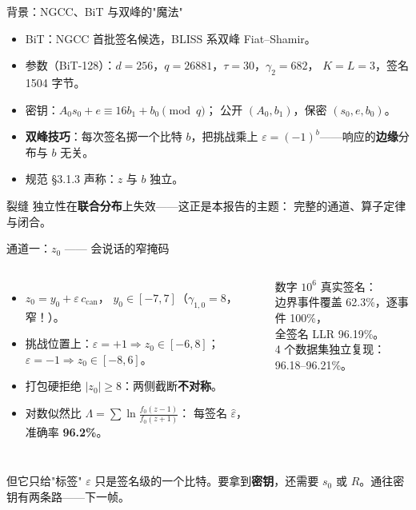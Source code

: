 \documentclass[11pt,aspectratio=169]{ctexbeamer}
\begin{document}
\begin{frame}{背景：NGCC、BiT 与双峰的"魔法"}
  \begin{itemize}
    \item BiT：NGCC 首批签名候选，BLISS 系双峰 Fiat--Shamir。
    \item 参数（BiT-128）：$d=256$，$q=26881$，$\tau=30$，$\gamma_2=682$，
          $K=L=3$，签名 1504 字节。
    \item 密钥：$A_0 s_0 + e \equiv 16 b_1 + b_0 \pmod q$；
          公开 $(A_0,b_1)$，保密 $(s_0,e,b_0)$。
    \item \textbf{双峰技巧}：每次签名掷一个比特 $b$，把挑战乘上
          $\varepsilon = (-1)^b$——响应的\textbf{边缘}分布与 $b$ 无关。
    \item 规范 §3.1.3 声称：$z$ 与 $b$ 独立。
  \end{itemize}
  \begin{alertblock}{裂缝}
    \small 独立性在\textbf{联合分布}上失效——这正是本报告的主题：
    完整的通道、算子定律与闭合。
  \end{alertblock}
\end{frame}

\begin{frame}{通道一：$z_0$ —— 会说话的窄掩码}
  \begin{columns}[T]
    \begin{itemize}
      \item $z_0 = y_0 + \varepsilon\,c_{\mathrm{can}}$，
            $y_0 \in [-7,7]$（$\gamma_{1,0}=8$，窄！）。
      \item 挑战位置上：$\varepsilon=+1 \Rightarrow z_0\in[-6,8]$；
            $\varepsilon=-1 \Rightarrow z_0\in[-8,6]$。
      \item 打包硬拒绝 $|z_0|\ge8$：两侧截断\textbf{不对称}。
      \item 对数似然比 $\Lambda = \sum \ln\frac{f_0(z-1)}{f_0(z+1)}$：
            每签名 $\hat\varepsilon$，准确率 \textbf{96.2\%}。
    \end{itemize}
    \begin{exampleblock}{数字}
      \small $10^6$ 真实签名：\\
      边界事件覆盖 62.3\%，逐事件 100\%，\\
      全签名 LLR 96.19\%。\\[0.3em]
      4 个数据集独立复现：96.18--96.21\%。
    \end{exampleblock}
  \end{columns}
  \vspace{0.2em}
  \begin{block}{但它只给"标签"}
    \small $\varepsilon$ 只是签名级的一个比特。要拿到\textbf{密钥}，还需要
    $s_0$ 或 $R$。通往密钥有两条路——下一帧。
  \end{block}
\end{frame}
\end{document}
